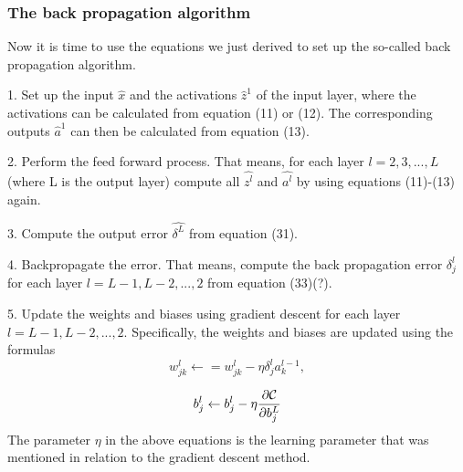 \documentclass[a4paper,12pt]{article}
\begin{document}
\subsubsection{The back propagation algorithm}
Now it is time to use the equations we just derived to set up the so-called back propagation algorithm.\newline

1. Set up the input $\hat{x}$ and the activations $\hat{z}^1$ of the input layer, where the activations can be calculated from equation (11) or (12). The corresponding outputs $\hat{a}^1$ can then be calculated from equation (13).\newline 

2. Perform the feed forward process. That means, for each layer $l = 2, 3,..., L$ (where L is the output layer) compute all $\hat{z^l}$ and $\hat{a^l}$ by using equations (11)-(13) again.\newline

3. Compute the output error $\hat{\delta^L}$ from equation (31).\newline

4. Backpropagate the error. That means, compute the back propagation error $\delta_j^l$ for each layer $l = L-1, L-2,..., 2$ from equation (33)(?).\newline

5. Update the weights and biases using gradient descent for each layer $l=L-1, L-2,..., 2$. Specifically, the weights and biases are updated using the formulas
\begin{equation}
    w_{jk}^l\leftarrow  = w_{jk}^l- \eta \delta_j^la_k^{l-1},
\end{equation}

\begin{equation}
    b_j^l \leftarrow b_j^l-\eta \frac{\partial {\cal C}}{\partial b_j^L}
\end{equation}
The parameter $\eta$ in the above equations is the learning parameter that was mentioned in relation to the gradient descent method.
\end{document}
